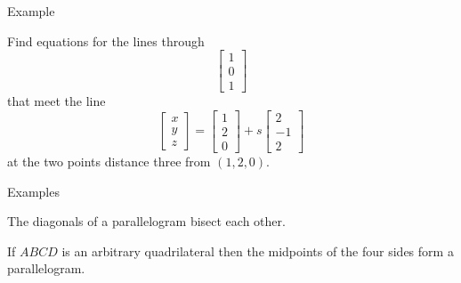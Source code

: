\documentclass{beamer}
\begin{document}
\begin{frame}{Example}
    \begin{example}
        Find equations for the lines through
        \begin{equation*}
            \left[
            \begin{array}{c}
            1\\
            0\\
            1
            \end{array}
            \right]
        \end{equation*}
        that meet the line
        \begin{equation*}
            \left[
            \begin{array}{c}
            x\\
            y\\
            z
            \end{array}
            \right] = \left[
            \begin{array}{c}
            1\\
            2\\
            0
            \end{array}
            \right]+s \left[
            \begin{array}{c}
            2\\
            -1\\
            2
            \end{array}
            \right]
        \end{equation*}
        at the two points distance three from $(1, 2, 0)$.
    \end{example}
\end{frame}

\begin{frame}{Examples}
    \begin{example}
        The diagonals of a parallelogram bisect each other.
      \end{example}
      \begin{example}
        If $ABCD$ is an arbitrary quadrilateral then the midpoints of the four sides form a parallelogram.
      \end{example}
\end{frame}
\end{document}
